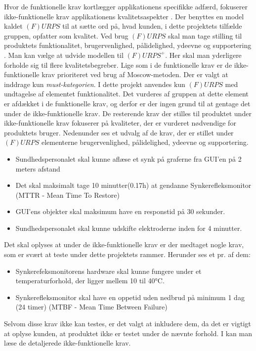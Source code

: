 Hvor de funktionelle krav kortlægger applikationens specifikke adfærd, fokuserer ikke-funktionelle krav applikationens kvalitetsaspekter \cite{ISELektioner}.
Der benyttes en model kaldet $(F)URPS$ til at sætte ord på, hvad kunden, i dette projektets tilfælde gruppen, opfatter som kvalitet. Ved brug $(F)URPS$ skal man tage stilling til produktets funktionalitet, brugervenlighed, pålidelighed, ydeevne og supportering \cite{ISELektioner}. Man kan vælge at udvide  modellen til  $(F)URPS^{+}$. Her skal man yderligere forholde sig til flere kvalitetsbegreber. Lige som i de funktionelle krav er de ikke-funktionelle krav prioriteret ved brug af Moscow-metoden. Der er valgt at inddrage kun \textit{must-kategorien}. I dette projekt anvendes kun $(F)URPS$ med undtagelse af  elementet funktionalitet. Det vurderes af gruppen at  dette element er afdækket i de funktionelle krav, og derfor er der ingen grund til at gentage det under de ikke-funktionelle krav. De resterende krav der stilles til produktet under ikke-funktionelle krav fokuserer på kvaliteter, der er vurderet nødvendige for produktets bruger. Nedenunder ses et udvalg af de krav, der  er stillet under $(F)URPS$ elementerne brugervenlighed, pålidelighed, ydeevne og supportering. 

\begin{itemize}
\item Sundhedspersonalet skal kunne aflæse et synk på graferne fra GUI'en på 2 meters afstand

\item Det skal maksimalt tage 10 minutter(0.17h) at gendanne Synkerefleksmonitor (MTTR - Mean Time To Restore)

\item GUI'ens objekter skal maksimum have en responstid på 30 sekunder. 

\item Sundhedspersonalet skal kunne udskifte elektroderne inden for 4 minutter.
\end{itemize}

Det skal oplyses at under de ikke-funktionelle krav er der medtaget nogle krav, som er svært at teste under dette projektets rammer. Herunder ses et pr. af dem:

\begin{itemize}
\item  Synkerefeksmonitorens hardware skal kunne fungere under et temperaturforhold, der ligger mellem 10 til 40°C.
\item Synkerefleksmonitor skal have en oppetid uden nedbrud på minimum 1 dag (24 timer) (MTBF - Mean Time Between Failure)
\end{itemize}

Selvom disse krav ikke kan testes, er det valgt at inkludere dem, da det er vigtigt at oplyse kunden, at produktet ikke er testet under de nævnte forhold. I  kan man læse de detaljerede ikke-funktionelle krav.

 


 


